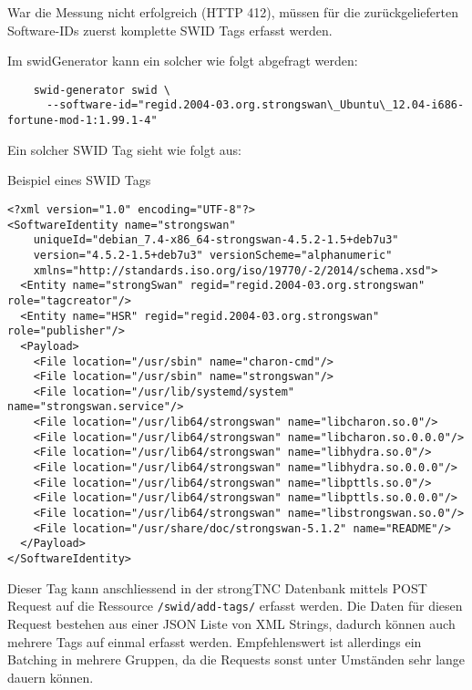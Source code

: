 \documentclass[10pt,a4paper]{scrartcl}
\begin{document}
War die Messung nicht erfolgreich (HTTP 412), müssen für die zurückgelieferten
Software-IDs zuerst komplette SWID Tags erfasst werden.

Im swidGenerator kann ein solcher wie folgt abgefragt werden:

\begin{small}\begin{verbatim}
	swid-generator swid \
	  --software-id="regid.2004-03.org.strongswan\_Ubuntu\_12.04-i686-fortune-mod-1:1.99.1-4"
\end{verbatim}\end{small}

Ein solcher SWID Tag sieht wie folgt aus:

\begin{listing}
\caption{Beispiel eines SWID Tags}
\begin{small}
\begin{verbatim}
<?xml version="1.0" encoding="UTF-8"?>
<SoftwareIdentity name="strongswan" 
	uniqueId="debian_7.4-x86_64-strongswan-4.5.2-1.5+deb7u3" 
	version="4.5.2-1.5+deb7u3" versionScheme="alphanumeric" 
	xmlns="http://standards.iso.org/iso/19770/-2/2014/schema.xsd">
  <Entity name="strongSwan" regid="regid.2004-03.org.strongswan" role="tagcreator"/>
  <Entity name="HSR" regid="regid.2004-03.org.strongswan" role="publisher"/>
  <Payload>
    <File location="/usr/sbin" name="charon-cmd"/>
    <File location="/usr/sbin" name="strongswan"/>
    <File location="/usr/lib/systemd/system" name="strongswan.service"/>
    <File location="/usr/lib64/strongswan" name="libcharon.so.0"/>
    <File location="/usr/lib64/strongswan" name="libcharon.so.0.0.0"/>
    <File location="/usr/lib64/strongswan" name="libhydra.so.0"/>
    <File location="/usr/lib64/strongswan" name="libhydra.so.0.0.0"/>
    <File location="/usr/lib64/strongswan" name="libpttls.so.0"/>
    <File location="/usr/lib64/strongswan" name="libpttls.so.0.0.0"/>
    <File location="/usr/lib64/strongswan" name="libstrongswan.so.0"/>
    <File location="/usr/share/doc/strongswan-5.1.2" name="README"/>
  </Payload>
</SoftwareIdentity>
\end{verbatim}
\end{small}
\end{listing}

Dieser Tag kann anschliessend in der strongTNC Datenbank mittels POST Request
auf die Ressource \texttt{/swid/add-tags/} erfasst werden. Die Daten für diesen
Request bestehen aus einer JSON Liste von XML Strings, dadurch können auch
mehrere Tags auf einmal erfasst werden. Empfehlenswert ist allerdings ein
Batching in mehrere Gruppen, da die Requests sonst unter Umständen sehr lange
dauern können. 
\end{document}
